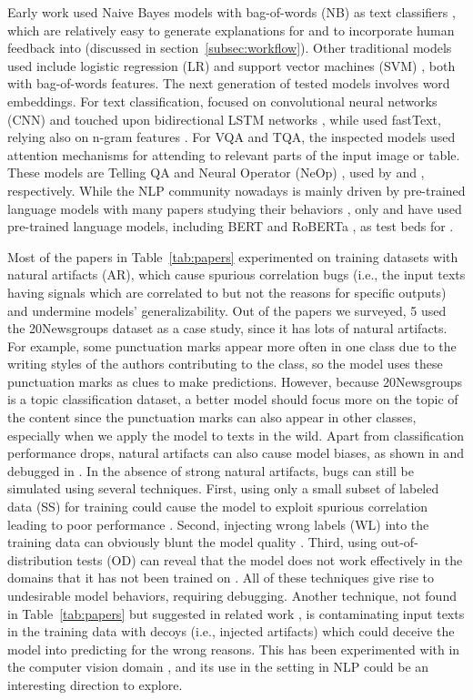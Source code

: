 Early work used Naive Bayes models with bag-of-words (NB) as text classifiers , which are relatively easy to generate explanations for and to incorporate human feedback into (discussed in section~\ref{subsec:workflow}).
Other traditional models used include logistic regression (LR)  
and support vector machines (SVM) , both with bag-of-words features.
The next generation of tested models involves word embeddings.
For text classification,  
focused on convolutional neural networks (CNN)  and touched upon bidirectional LSTM networks , while  used fastText, relying also on n-gram features .
For VQA and TQA, the inspected models used attention mechanisms for attending to relevant parts of the input image or table. These models are Telling QA  and Neural Operator (NeOp) , used by  and , respectively.
While the NLP community nowadays is mainly driven by pre-trained language models 
with many papers studying their behaviors , 
only  and  have used pre-trained language models, including BERT  and RoBERTa , as test beds for \EBHD.

\label{subsec:bugsources}
Most of the papers in Table~\ref{tab:papers} experimented on training datasets with natural artifacts (AR), which cause spurious correlation bugs (i.e., the input texts having signals which are correlated to but not the reasons for specific outputs) and undermine models' generalizability.
Out of the \numpapers papers we surveyed, 5 used the 20Newsgroups dataset  as a case study, since it has lots of natural artifacts. 
For example, some punctuation marks appear more often in one class due to the writing styles of the authors contributing to the class, so the model uses these punctuation marks as clues to make predictions. However, because 20Newsgroups is a topic classification dataset, a better model should focus more on the topic of the content since the punctuation marks can also appear in other classes, especially when we apply the model to texts in the wild.
Apart from classification performance drops, natural artifacts can also cause model biases, as shown in  and debugged in .
In the absence of strong natural artifacts, bugs can still be simulated using several techniques. 
First, using only a small subset of labeled data (SS) for training could cause the model to exploit spurious correlation leading to poor performance . 
Second, injecting wrong labels (WL) into the training data can obviously blunt the model quality . 
Third, using out-of-distribution tests (OD) can reveal that the model does not work effectively in the domains that it has not been trained on .
All of these techniques give rise to undesirable model behaviors, requiring debugging.
Another technique, not found in Table~\ref{tab:papers} but suggested in related work , is contaminating input texts in the training data with decoys (i.e., injected artifacts) which could deceive the model into predicting for the wrong reasons. This has been experimented with in the computer vision domain , and its use in the \EBHD setting in NLP could be an interesting direction to explore.

